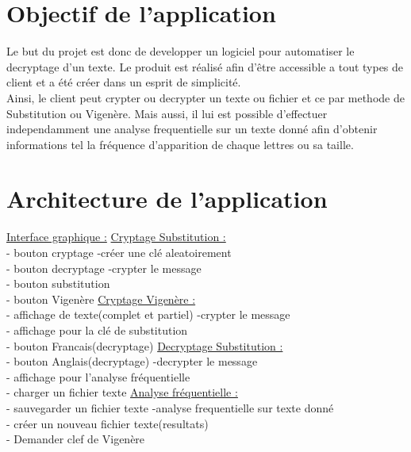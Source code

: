 \documentclass[a4]{article}
\begin{document}
	\section{Objectif de l'application}
	
	
	Le but du projet est donc de developper un logiciel pour automatiser le decryptage d'un texte.
	Le produit est réalisé afin d'être accessible a tout types de client et a été créer dans un esprit de simplicité.\\
	Ainsi, le client peut crypter ou decrypter un texte ou fichier et ce par methode de Substitution ou Vigenère.
	Mais aussi, il lui est possible d'effectuer independamment une analyse frequentielle sur un texte donné afin d'obtenir
	informations tel la fréquence d'apparition de chaque lettres ou sa taille.
	
	

	\section{Architecture de l'application}
			\underline{Interface graphique :}     \hspace{5cm}  \underline{Cryptage Substitution :}\\
			- bouton cryptage            \hspace{5.5cm}       -créer une clé aleatoirement\\
			- bouton decryptage         \hspace{5cm}        -crypter le message\\
			- bouton substitution\\
			- bouton Vigenère           \hspace{5.2cm}       \underline{Cryptage Vigenère :}\\
			- affichage de texte(complet et partiel)  \hspace{2.2cm} -crypter le message\\
			- affichage pour la clé de substitution\\
			- bouton Francais(decryptage)   \hspace{3.5cm}     \underline{Decryptage Substitution :}\\
			- bouton Anglais(decryptage)    \hspace{3.5cm}     -decrypter le message\\
			- affichage pour l'analyse fréquentielle\\
			- charger un fichier texte       \hspace{4.2cm}  \underline{Analyse fréquentielle :}\\
			- sauvegarder un fichier texte     \hspace{3.8cm}  -analyse frequentielle sur texte donné\\
			- créer un nouveau fichier texte(resultats)\\
			- Demander clef de Vigenère\\
			
\end{document}

